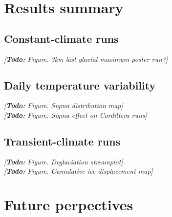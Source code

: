 \documentclass{article}
\newcommand{\todo}[1]{\emph{[\textbf{Todo:} #1]}}
\begin{document}
\section{Results summary}

\subsection{Constant-climate runs}
\todo{Figure. 3km last glacial maximum poster run?}

\subsection{Daily temperature variability}
\todo{Figure. Sigma distribution map}\\
\todo{Figure. Sigma effect on Cordillera runs}

\subsection{Transient-climate runs}
\todo{Figure. Deglaciation streamplot}\\
\todo{Figure. Cumulative ice displacement map}

\section{Future perpectives}

\newcommand{\urlprefix}[0]{}  %



\end{document}

